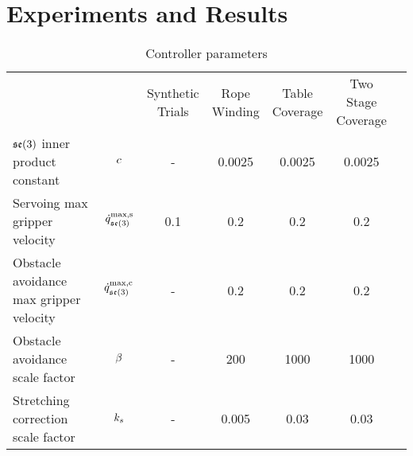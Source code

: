 \section{Experiments and Results}


\begin{table*}[t]
\centering
\caption{Controller parameters}
\label{tab:controller_param_table}
\begin{tabular}{lcccccc}
\hline\noalign{\smallskip}
                                                        &                       & \makecell{Synthetic\\Trials} 
                                                                                & \makecell{Rope\\Winding}
                                                                                & \makecell{Table\\Coverage}
                                                                                & \makecell{Two Stage\\Coverage} \\
\noalign{\smallskip}\hline\noalign{\smallskip}
\makecell[l]{$\mathfrak{se}(3)$ inner\\product constant}      & $c$        &   - & 0.0025 & 0.0025 & 0.0025 \\
\noalign{\smallskip}
\makecell[l]{Servoing max\\gripper velocity}           & $\dot{q}^\textrm{max,s}_{\mathfrak{se}(3)}$  & 0.1 &    0.2 &    0.2 &    0.2 \\
\noalign{\smallskip}
\makecell[l]{Obstacle avoidance\\max gripper velocity} & $\dot{q}^\textrm{max,c}_{\mathfrak{se}(3)}$    &   - &    0.2 &    0.2 &    0.2 \\
\noalign{\smallskip}
\makecell[l]{Obstacle avoidance\\scale factor}         & $\beta$      &   - &    200 &   1000 &   1000 \\
\noalign{\smallskip}
\makecell[l]{Stretching correction\\scale factor}      & $k_s$ &   - &  0.005 &   0.03 &   0.03 \\
\hline
\end{tabular}
\end{table*}
